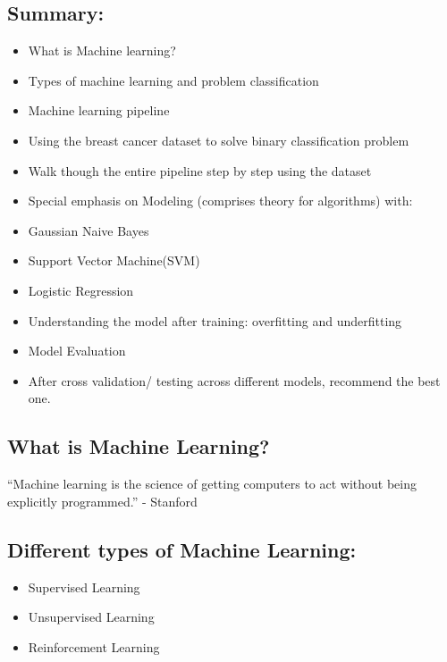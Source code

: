 \documentclass[11pt]{article}
\providecommand{\tightlist}{%
      \setlength{\itemsep}{0pt}\setlength{\parskip}{0pt}}
\begin{document}
    

    \hypertarget{summary}{%
\subsection{Summary:}\label{summary}}

\begin{itemize}
\tightlist
\item
  What is Machine learning?
\item
  Types of machine learning and problem classification
\item
  Machine learning pipeline
\item
  Using the breast cancer dataset to solve binary classification problem
\item
  Walk though the entire pipeline step by step using the dataset
\item
  Special emphasis on Modeling (comprises theory for algorithms) with:
\item
  Gaussian Naive Bayes
\item
  Support Vector Machine(SVM)
\item
  Logistic Regression
\item
  Understanding the model after training: overfitting and underfitting
\item
  Model Evaluation
\item
  After cross validation/ testing across different models, recommend the
  best one.
\end{itemize}

    

    \hypertarget{what-is-machine-learning}{%
\subsection{What is Machine Learning?}\label{what-is-machine-learning}}

``Machine learning is the science of getting computers to act without
being explicitly programmed.'' - Stanford

    \hypertarget{different-types-of-machine-learning}{%
\subsection{Different types of Machine
Learning:}\label{different-types-of-machine-learning}}

    \begin{itemize}
\tightlist
\item
  Supervised Learning
\item
  Unsupervised Learning
\item
  Reinforcement Learning
\end{itemize}
\end{document}
